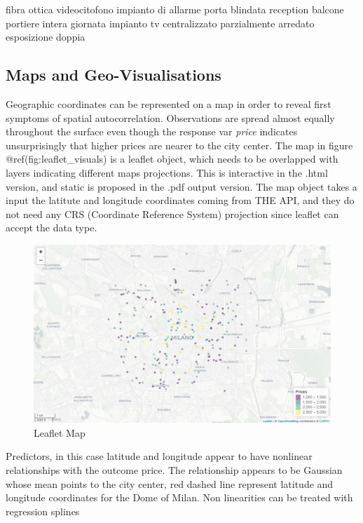 \documentclass[
  12pt,
  a4paper,
  oneside]{book}
\theoremstyle{definition}
\theoremstyle{definition}
\theoremstyle{definition}
\theoremstyle{remark}
\begin{document}
fibra ottica videocitofono impianto di allarme porta blindata reception balcone portiere intera giornata impianto tv centralizzato parzialmente arredato esposizione doppia

\hypertarget{maps-and-geo-visualisations}{%
\subsection{Maps and Geo-Visualisations}\label{maps-and-geo-visualisations}}

Geographic coordinates can be represented on a map in order to reveal first symptoms of spatial autocorrelation. Observations are spread almost equally throughout the surface even though the response var \emph{price} indicates unsurprisingly that higher prices are nearer to the city center.
The map in figure @ref(fig:leaflet\_visuals) is a leaflet object, which needs to be overlapped with layers indicating different maps projections. This is interactive in the .html version, and static is proposed in the .pdf output version. The map object takes a input the latitute and longitude coordinates coming from THE API, and they do not need any CRS (Coordinate Reference System) projection since leaflet can accept the data type.

\begin{figure}
\includegraphics[width=1\linewidth]{images/leaflet_prezzi} \caption{Leaflet Map}\label{fig:LeafletVisuals}
\end{figure}

Predictors, in this case latitude and longitude appear to have nonlinear relationships with the outcome price. The relationship appears to be Gaussian whose mean points to the city center, red dashed line represent latitude and longitude coordinates for the Dome of Milan. Non linearities can be treated with regression splines
\end{document}
